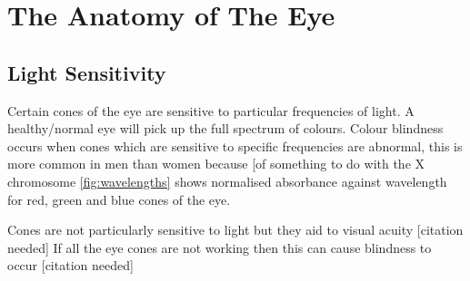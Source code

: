 
\chapter{The Anatomy of The Eye}

\label{anatomy} %


\section{Light Sensitivity}

Certain cones of the eye are sensitive to particular frequencies of light.
A healthy/normal eye will pick up the full spectrum of colours. Colour blindness
occurs when cones which are sensitive to specific frequencies are abnormal, this
is more common in men than women because [of something to do with the X
chromosome\cite{gardner2010x} \ref{fig:wavelengths} shows normalised absorbance
against wavelength for red, green and blue cones of the eye.

Cones are not particularly sensitive to light but they aid to visual acuity
[citation needed] If all the eye cones are not working then this can cause
blindness to occur [citation needed]

